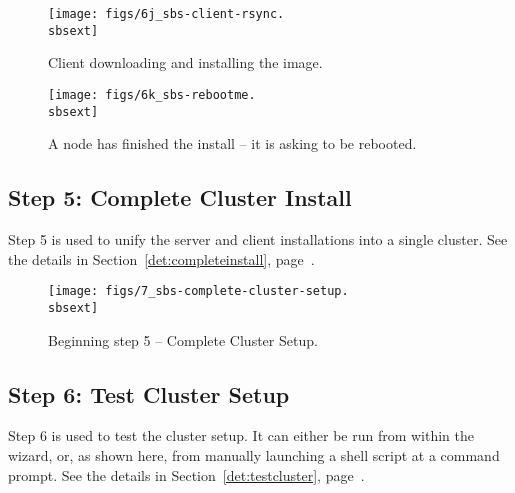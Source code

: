 \begin{figure}[htbp]
  \begin{center}
    \centerline{\texttt{[image: figs/6j\_sbs-client-rsync.\\sbsext]}}
    \caption{Client downloading and installing the image.}
    \label{fig:sbs-install-rsync}
  \end{center}
\end{figure}

\begin{figure}[htbp]
  \begin{center}
    \centerline{\texttt{[image: figs/6k\_sbs-rebootme.\\sbsext]}}
    \caption{A node has finished the install -- it is asking to be
      rebooted.}
    \label{fig:sbs-install-finish}
  \end{center}
\end{figure}

\clearpage



\subsection{Step 5: Complete Cluster Install} 

Step 5 is used to unify the server and client installations into a
single cluster.  See the details in Section~\ref{det:completeinstall},
page~\pageref{det:completeinstall}.

\begin{figure}[h]
   \begin{center}
     \centerline{\texttt{[image: figs/7\_sbs-complete-cluster-setup.\\sbsext]}}
     \caption{Beginning step 5 -- Complete Cluster Setup.}
     \label{fig:sbs-install-wizard-s5}
   \end{center}
 \end{figure}

\clearpage



\subsection{Step 6: Test Cluster Setup}

Step 6 is used to test the cluster setup.  It can either be run from
within the wizard, or, as shown here, from manually launching a shell
script at a  command prompt.  See the details in
Section~\ref{det:testcluster}, page~\pageref{det:testcluster}.

